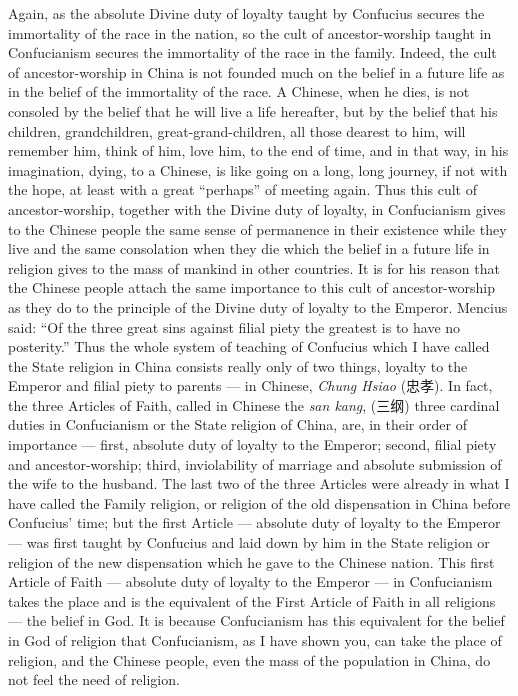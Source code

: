 Again, as the absolute Divine duty of loyalty taught by Confucius secures the immortality of the race in the nation, so the cult of ancestor-worship taught in Confucianism secures the immortality of the race in the family.
Indeed, the cult of ancestor-worship in China is not founded much on the belief in a future life as in the belief of the immortality of the race.
A Chinese, when he dies, is not consoled by the belief that he will live a life hereafter, but by the belief that his children, grandchildren, great-grand-children, all those dearest to him, will remember him, think of him, love him, to the end of time, and in that way, in his imagination, dying, to a Chinese, is like going on a long, long journey, if not with the hope, at least with a great ``perhaps'' of meeting again.
Thus this cult of ancestor-worship, together with the Divine duty of loyalty, in Confucianism gives to the Chinese people the same sense of permanence in their existence while they live and the same consolation when they die which the belief in a future life in religion gives to the mass of mankind in other countries.
It is for his reason that the Chinese people attach the same importance to this cult of ancestor-worship as they do to the principle of the Divine duty of loyalty to the Emperor.
Mencius said: ``Of the three great sins against filial piety the greatest is to have no posterity.''
Thus the whole system of teaching of Confucius which I have called the State religion in China consists really only of two things, loyalty to the Emperor and filial piety to parents --- in Chinese, \emph{Chung Hsiao} (忠孝).
In fact, the three Articles of Faith, called in Chinese the \emph{san kang}, (三纲) three cardinal duties in Confucianism or the State religion of China, are, in their order of importance --- first, absolute duty of loyalty to the Emperor; 
second, filial piety and ancestor-worship;
third, inviolability of marriage and absolute submission of the wife to the husband.
The last two of the three Articles were already in what I have called the Family religion, or religion of the old dispensation in China before Confucius' time;
but the first Article --- absolute duty of loyalty to the Emperor --- was first taught by Confucius and laid down by him in the State religion or religion of the new dispensation which he gave to the Chinese nation.
This first Article of Faith --- absolute duty of loyalty to the Emperor --- in Confucianism takes the place and is the equivalent of the First Article of Faith in all religions --- the belief in God.
It is because Confucianism has this equivalent for the belief in God of religion that Confucianism, as I have shown you, can take the place of religion, and the Chinese people, even the mass of the population in China, do not feel the need of religion.

